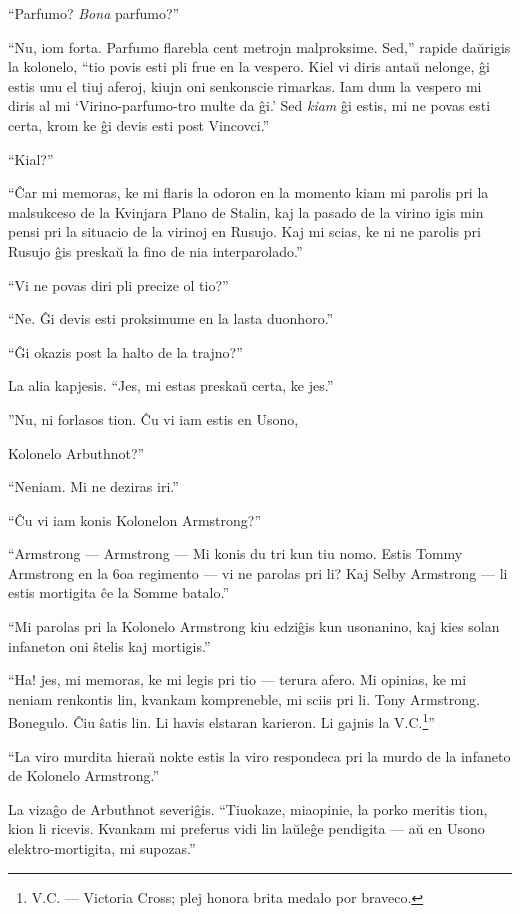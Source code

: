 ``Parfumo? \emph{Bona} parfumo?''

``Nu, iom forta. Parfumo flarebla cent metrojn malproksime. Sed,'' rapide daŭrigis la kolonelo, ``tio povis esti pli frue en la vespero. Kiel vi diris antaŭ nelonge, ĝi estis unu el tiuj aferoj, kiujn oni senkonscie rimarkas. Iam dum la vespero mi diris al mi `Virino-parfumo-tro multe da ĝi.' Sed \emph{kiam} ĝi estis, mi ne povas esti certa, krom ke ĝi devis esti post Vincovci.''

``Kial?''

``Ĉar mi memoras, ke mi flaris la odoron en la momento kiam mi parolis pri la malsukceso de la Kvinjara Plano de Stalin, kaj la pasado de la virino igis min pensi pri la situacio de la virinoj en Rusujo. Kaj mi scias, ke ni ne parolis pri Rusujo ĝis preskaŭ la fino de nia interparolado.''

``Vi ne povas diri pli precize ol tio?''

``Ne. Ĝi devis esti proksimume en la lasta duonhoro.''

``Ĝi okazis post la halto de la trajno?''

La alia kapjesis. ``Jes, mi estas preskaŭ certa, ke jes.''

''Nu, ni forlasos tion. Ĉu vi iam estis en Usono,

Kolonelo Arbuthnot?''

``Neniam. Mi ne deziras iri.''

``Ĉu vi iam konis Kolonelon Armstrong?''

``Armstrong --- Armstrong --- Mi konis du tri kun tiu nomo. Estis Tommy Armstrong en la 6oa regimento --- vi ne parolas pri li? Kaj Selby Armstrong --- li estis mortigita ĉe la Somme batalo.''

``Mi parolas pri la Kolonelo Armstrong kiu edziĝis kun usonanino, kaj kies solan infaneton oni ŝtelis kaj mortigis.''

``Ha! jes, mi memoras, ke mi legis pri tio --- terura afero. Mi opinias, ke mi neniam renkontis lin, kvankam kompreneble, mi sciis pri li. Tony Armstrong. Bonegulo. Ĉiu ŝatis lin. Li havis elstaran karieron. Li gajnis la V.C.\footnote{V.C. --- Victoria Cross; plej honora brita medalo por braveco.}''

``La viro murdita hieraŭ nokte estis la viro respondeca pri la murdo de la infaneto de Kolonelo Armstrong.''

La vizaĝo de Arbuthnot severiĝis. ``Tiuokaze, miaopinie, la porko meritis tion, kion li ricevis. Kvankam mi preferus vidi lin laŭleĝe pendigita --- aŭ en Usono elektro-mortigita, mi supozas.''

